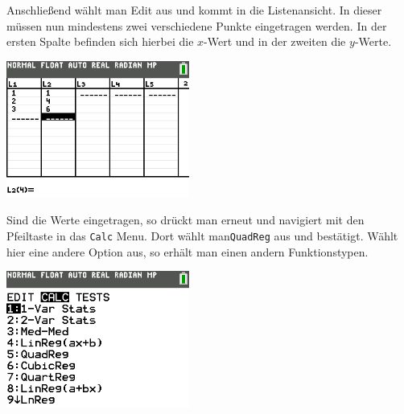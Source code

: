 \begin{paracol}{2}
	\begin{flushleft}
	Anschließend wählt man Edit aus und kommt in die Listenansicht. In dieser müssen nun mindestens zwei verschiedene Punkte eingetragen werden. In der ersten Spalte befinden sich hierbei die $x$-Wert und in der zweiten die $y$-Werte. 
	\end{flushleft}	
\switchcolumn
	\begin{flushright}
		\includegraphics[width=6cm]{Media/GRT/Visualisierung/Regression/Regression_5.png}
	\end{flushright}
\end{paracol}

\begin{paracol}{2}
	\begin{flushleft}
	Sind die Werte eingetragen, so drückt man erneut  und navigiert mit den Pfeiltaste in das \texttt{Calc} Menu. Dort wählt man\texttt{QuadReg} aus und bestätigt. Wählt hier eine andere Option aus, so erhält man einen andern Funktionstypen.
	\end{flushleft}	
\switchcolumn
	\begin{flushright}
		\includegraphics[width=6cm]{Media/GRT/Visualisierung/Regression/Regression_3.png}
	\end{flushright}
\end{paracol}

